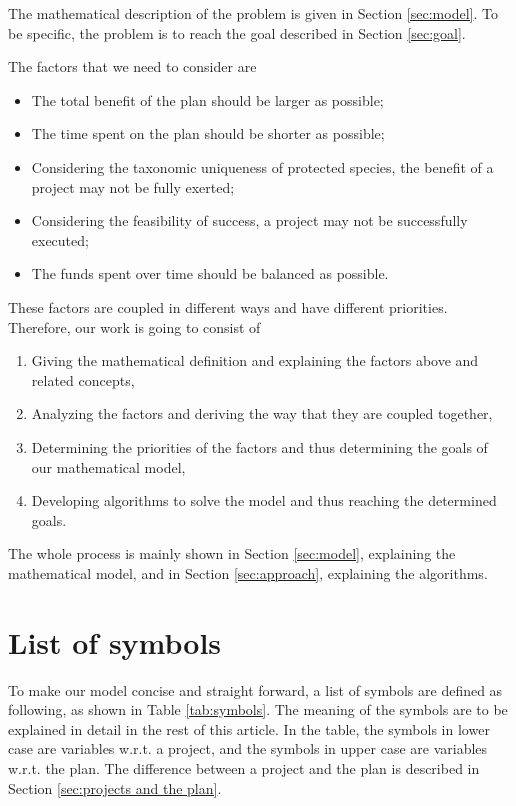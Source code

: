 \documentclass{article}
\begin{document}
The mathematical description of the problem is given in Section \ref{sec:model}.
To be specific, the problem is to reach the goal described in Section \ref{sec:goal}.

The factors that we need to consider are
\begin{itemize}
\item The total benefit of the plan should be larger as possible;
\item The time spent on the plan should be shorter as possible;
\item Considering the taxonomic uniqueness of protected species, the benefit of a project may not be fully exerted;
\item Considering the feasibility of success, a project may not be successfully executed;
\item The funds spent over time should be balanced as possible.
\end{itemize}

These factors are coupled in different ways and have different priorities.
Therefore, our work is going to consist of
\begin{enumerate}
\item Giving the mathematical definition and explaining the factors above and related concepts,
\item Analyzing the factors and deriving the way that they are coupled together,
\item Determining the priorities of the factors and thus determining the goals of our mathematical model,
\item Developing algorithms to solve the model and thus reaching the determined goals.
\end{enumerate}

The whole process is mainly shown in Section \ref{sec:model}, explaining the mathematical model, and in Section \ref{sec:approach}, explaining the algorithms.

\section{List of symbols}

To make our model concise and straight forward, a list of symbols are defined as following, as shown in Table \ref{tab:symbols}.
The meaning of the symbols are to be explained in detail in the rest of this article.
In the table, the symbols in lower case are variables w.r.t. a project,
and the symbols in upper case are variables w.r.t. the plan.
The difference between a project and the plan is described in Section \ref{sec:projects and the plan}.
\end{document}
